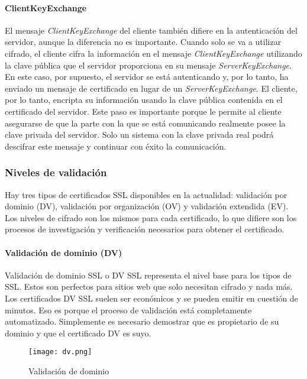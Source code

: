 \paragraph*{ClientKeyExchange}
El mensaje \emph{ClientKeyExchange} del cliente también difiere en la autenticación 
del servidor, aunque la diferencia no es importante. Cuando solo se va a 
utilizar cifrado, el cliente cifra la información en el mensaje 
\emph{ClientKeyExchange}
utilizando la clave pública que el servidor proporciona en su mensaje 
\emph{ServerKeyExchange}. En este caso, por supuesto, el servidor se está 
autenticando y, por lo tanto, ha enviado un mensaje de certificado en 
lugar de un \emph{ServerKeyExchange}. El cliente, por lo tanto, encripta su 
información usando la clave pública contenida en el 
certificado del servidor. Este paso es importante porque le permite 
al cliente asegurarse de que la parte con la que se está comunicando 
realmente posee la clave privada del servidor. Solo un sistema con la 
clave privada real podrá descifrar este mensaje y continuar con éxito 
la comunicación.

 

\subsubsection*{Niveles de validación}  
Hay tres tipos de certificados SSL disponibles en la actualidad: validación por 
dominio (DV),
validación por organización (OV) y validación extendida (EV).
Los niveles de cifrado son los mismos para cada certificado, lo que difiere son los 
procesos de investigación y verificación necesarios para obtener el certificado.

\paragraph*{Validación de dominio (DV)}
Validación de dominio SSL o DV SSL representa el nivel base para los tipos de SSL. 
Estos son perfectos para sitios web que solo necesitan cifrado y nada más. Los 
certificados DV SSL suelen ser económicos y se pueden emitir en cuestión de minutos. 
Eso es porque el proceso de validación está completamente automatizado. Simplemente 
es necesario demostrar que es propietario de su dominio y que el certificado DV 
es suyo. 

\begin{center}
   \begin{figure}   
      \begin{center}
         \texttt{[image: dv.png]}
      \end{center}
      \caption{Validación de dominio}
   \end{figure}
\end{center}

